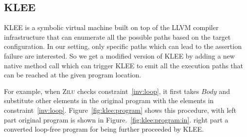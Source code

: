 



\subsection{KLEE}
\label{subsec:klee}
KLEE is a symbolic virtual machine built on top of the LLVM compiler infrastructure
that can enumerate all the possible paths based on the target configuration.
In our setting, only specific paths which can lead to the assertion failure are interested.
So we get a modified version of KLEE by adding a new native method call
which can trigger KLEE to emit all the execution paths that can be reached at the given program location.

For example, when \textsc{Zilu} checks constraint~\ref{inv:loop}, 
it first takes $Body$ and substitute other elements in the original program with the elements in constraint~\ref{inv:loop}.
Figure~\ref{fig:klee:program} shows this procedure,
with left part original program is shown in Figure.~\ref{fig:klee:program:in}.
right part a converted loop-free program for being further proceeded by KLEE.

